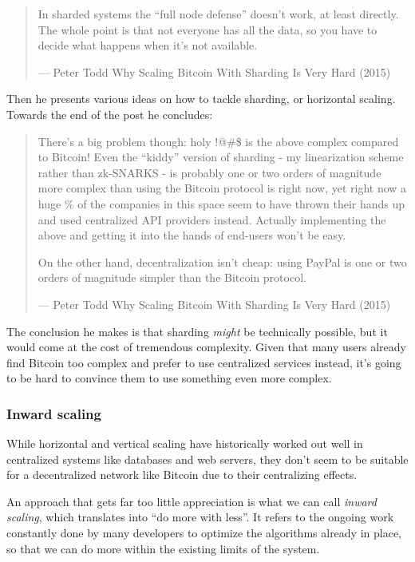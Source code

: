 \begin{quote}
In sharded systems the ``full node defense'' doesn't work, at least
directly. The whole point is that not everyone has all the data, so you
have to decide what happens when it's not available.

---  Peter Todd Why Scaling Bitcoin With Sharding Is Very Hard (2015)
\end{quote}

Then he presents various ideas on how to tackle sharding, or horizontal
scaling. Towards the end of the post he concludes:

\begin{quote}
There's a big problem though: holy !@\#\$ is the above complex compared
to Bitcoin! Even the ``kiddy'' version of sharding - my linearization
scheme rather than zk-SNARKS - is probably one or two orders of
magnitude more complex than using the Bitcoin protocol is right now, yet
right now a huge \% of the companies in this space seem to have thrown
their hands up and used centralized API providers instead. Actually
implementing the above and getting it into the hands of end-users won't
be easy.

On the other hand, decentralization isn't cheap: using PayPal is one or
two orders of magnitude simpler than the Bitcoin protocol.

---  Peter Todd Why Scaling Bitcoin With Sharding Is Very Hard (2015)
\end{quote}

The conclusion he makes is that sharding \emph{might} be technically
possible, but it would come at the cost of tremendous complexity. Given
that many users already find Bitcoin too complex and prefer to use
centralized services instead, it's going to be hard to convince them to
use something even more complex.

\hypertarget{_inward_scaling}{%
\subsubsection{Inward scaling}\label{_inward_scaling}}

While horizontal and vertical scaling have historically worked out well
in centralized systems like databases and web servers, they don't seem
to be suitable for a decentralized network like Bitcoin due to their
centralizing effects.

An approach that gets far too little appreciation is what we can call
\emph{inward scaling}, which translates into ``do more with less''. It
refers to the ongoing work constantly done by many developers to
optimize the algorithms already in place, so that we can do more within
the existing limits of the system.

